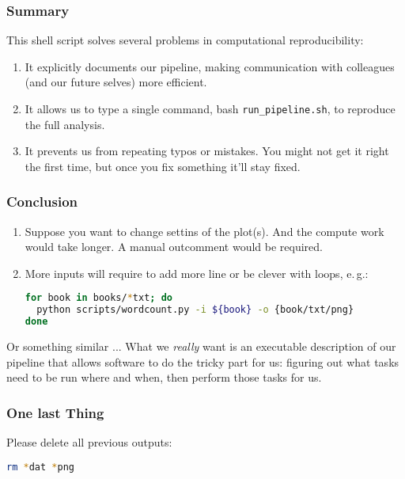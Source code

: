 \begin{frame}
  \frametitle{Summary}
  This  shell script solves several problems in computational reproducibility:
  \begin{enumerate}[<+->]
   \item It explicitly documents our pipeline, making communication with colleagues (and our future selves) more efficient.
   \item It allows us to type a single command, bash \texttt{run\_pipeline.sh}, to reproduce the full analysis.
   \item It prevents us from repeating typos or mistakes. You might not get it right the first time, but once you fix something it’ll stay fixed.
  \end{enumerate}
  \pause
\end{frame}

\begin{frame}[fragile]
  \frametitle{Conclusion}
  \begin{enumerate}[<+->]
   \item Suppose you want to change settins of the plot(s). And the compute work would take longer. A manual outcomment would be required.
   \item More inputs will require to add more line or be clever with loops, e.\,g.:
         \begin{lstlisting}[language=Bash, style=Shell]
for book in books/*txt; do 
  python scripts/wordcount.py -i ${book} -o {book/txt/png}
done
         \end{lstlisting}
  \end{enumerate}
  Or something similar ...\newline
  What we \emph{really} want is an executable description of our pipeline that allows software to do the tricky part for us: figuring out what tasks need to be run where and when, then perform those tasks for us.
\end{frame}

\begin{frame}[fragile]
  \frametitle{One last Thing}
  Please delete all previous outputs:
  \begin{lstlisting}[language=Bash, style=Shell]
rm *dat *png 
  \end{lstlisting}
\end{frame}




